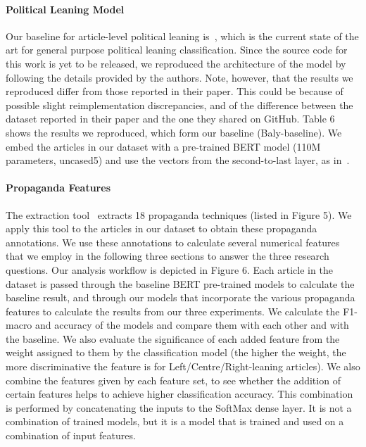 \paragraph{Political Leaning Model}
Our baseline for article-level political leaning is~\citet{baly2020we}, which is the current state of the art for general purpose political leaning classification. Since the source code for this work is yet to be released, we reproduced the architecture of the model by following the details provided by the authors. Note, however, that the results we reproduced differ from those reported in their paper. This could be because of possible slight reimplementation discrepancies, and of the difference between the dataset reported in their paper and the one they shared on GitHub. Table 6 shows the results we reproduced, which form our baseline (Baly-baseline).
We embed the articles in our dataset with a pre-trained BERT model (110M parameters, uncased5) and use the vectors from the second-to-last layer, as in~\citet{baly2020we}.


\paragraph{Propaganda Features}
The extraction tool~\citep{da2019fine} extracts 18 propaganda techniques (listed in Figure 5). We apply this tool to the articles in our dataset to obtain these propaganda annotations. We use these annotations to calculate several numerical features that we employ in the following three sections to answer the three research questions.
Our analysis workflow is depicted in Figure 6. Each article in the dataset is passed through the baseline BERT pre-trained models to calculate the baseline result, and through our models that incorporate the various propaganda features to calculate the results from our three experiments.
We calculate the F1-macro and accuracy of the models and compare them with each other and with the baseline. We also evaluate the significance of each added feature from the weight assigned to them by the classification model (the higher the weight, the more discriminative the feature is for Left/Centre/Right-leaning articles). We also combine the features given by each feature set, to see whether the addition of certain features helps to achieve higher classification accuracy. This combination is performed by concatenating the inputs to the SoftMax dense layer. It is not a combination of trained models, but it is a model that is trained and used on a combination of input features.

